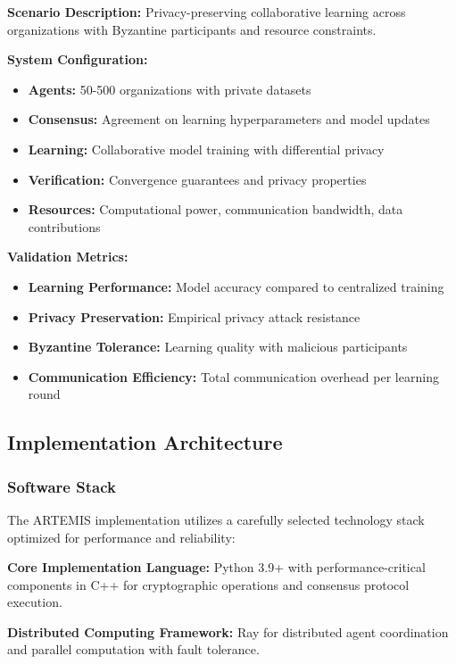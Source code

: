 \documentclass[conference]{IEEEtran}
\begin{document}
\textbf{Scenario Description:} Privacy-preserving collaborative learning across organizations with Byzantine participants and resource constraints.

\textbf{System Configuration:}
\begin{itemize}
    \item \textbf{Agents:} 50-500 organizations with private datasets
    \item \textbf{Consensus:} Agreement on learning hyperparameters and model updates
    \item \textbf{Learning:} Collaborative model training with differential privacy
    \item \textbf{Verification:} Convergence guarantees and privacy properties
    \item \textbf{Resources:} Computational power, communication bandwidth, data contributions
\end{itemize}

\textbf{Validation Metrics:}
\begin{itemize}
    \item \textbf{Learning Performance:} Model accuracy compared to centralized training
    \item \textbf{Privacy Preservation:} Empirical privacy attack resistance
    \item \textbf{Byzantine Tolerance:} Learning quality with malicious participants
    \item \textbf{Communication Efficiency:} Total communication overhead per learning round
\end{itemize}

\subsection{Implementation Architecture}

\subsubsection{Software Stack}

The ARTEMIS implementation utilizes a carefully selected technology stack optimized for performance and reliability:

\textbf{Core Implementation Language:} Python 3.9+ with performance-critical components in C++ for cryptographic operations and consensus protocol execution.

\textbf{Distributed Computing Framework:} Ray for distributed agent coordination and parallel computation with fault tolerance.
\end{document}
